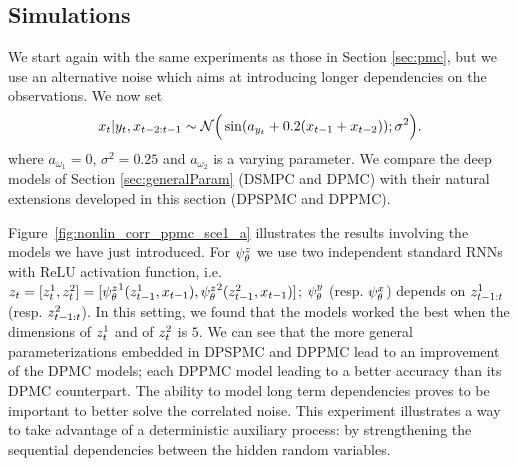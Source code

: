 \tocless\subsection{Simulations}
We start again with the same experiments 
as those in Section \ref{sec:pmc}, but we use 
an alternative noise which aims
at introducing longer dependencies on the observations. We now set
\begin{equation}
    \label{eq:longer_noise_eq1}
    x_t| y_{t},x_{t-2:t-1} \sim \mathcal{N}\Big(\sin(a_{y_t}+0.2(x_{t-1}+x_{t-2}));
    \sigma^2\Big).
\end{equation}
where $a_{\omega_1}=0$, $\sigma^2=0.25$ 
and $a_{\omega_2}$ is a varying parameter.
We compare the deep models of Section \ref{sec:generalParam} (DSMPC and DPMC) with their natural extensions
developed in this section (DPSPMC and DPPMC).
 
Figure~\ref{fig:nonlin_corr_ppmc_sce1_a} illustrates the results involving the models we have just introduced. For $\psi^{z}_{\theta}$ we use two independent standard RNNs with ReLU activation function, i.e. $z_t=[z_t^1,z_t^2]=[{\psi^{z}_{\theta}}^1(z_{t-1}^1,x_{t-1}),
{\psi^{z}_{\theta}}^2(z_{t-1}^2,x_{t-1})]$; $\psi^{y}_{\theta}$ (resp. $\psi^{x}_{\theta}$) depends on $z_{t-1:t}^1$ (resp. $z_{t-1:t}^2$). %
In this setting, we found that the models worked the best when the dimensions of $z_t^1$ and of $z_t^2$  is $5$.
We can see that the more general parameterizations embedded in   DPSPMC and DPPMC lead to an improvement of the DPMC models; each DPPMC model leading to a better accuracy than its DPMC counterpart. The ability to model long term dependencies proves to be important to better solve the correlated noise. This experiment illustrates a way to take advantage of a deterministic auxiliary process: by strengthening the sequential dependencies between the hidden random variables.



